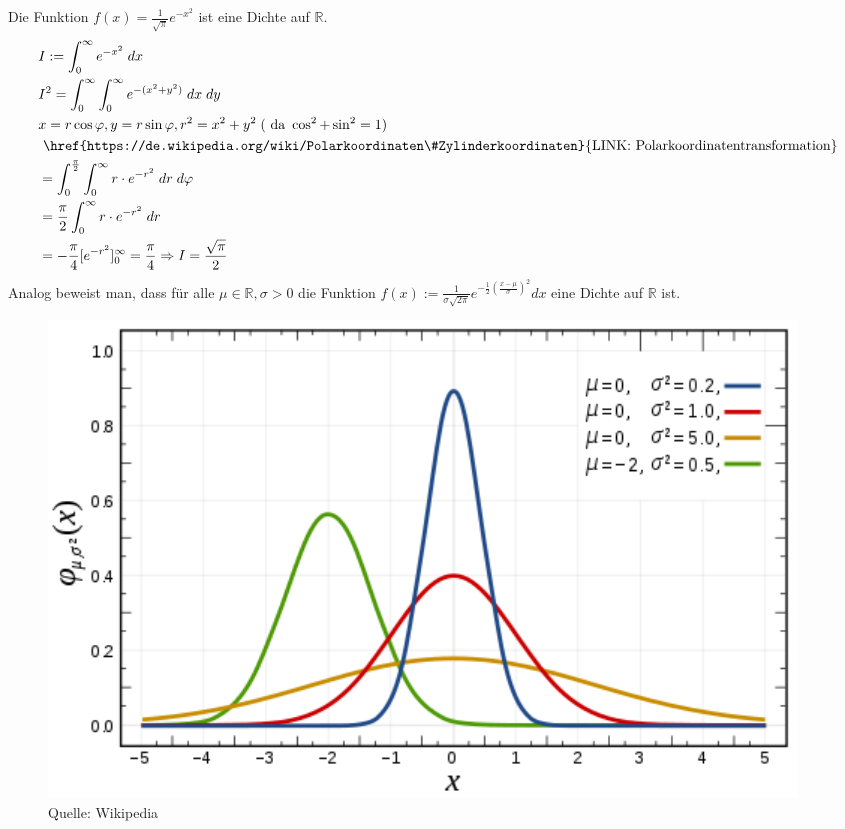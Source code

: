 \begin{Beispiel}
Die Funktion $f(x) = \frac{1}{\sqrt{\pi}} e^{- x^2}$ ist eine Dichte auf $ \mathbb{R}$.
\begin{align*}
& I := \int_{0}^{\infty} e^{-x^2} \; dx\\
& I^2 = \int_{0}^{\infty} \int_{0}^{\infty} e^{-(x^2+y^2)} \; dx \;dy \\
&x=r \cos \varphi ,y=r\sin \varphi ,r^2 = x^2 + y^2  \; (\text{ da } \cos^2 + \sin^2 = 1)\\
 &\text{ \href{https://de.wikipedia.org/wiki/Polarkoordinaten\#Zylinderkoordinaten}{LINK: Polarkoordinatentransformation}} \\
& = \int_{0}^{\frac{\pi}{2}}  \int_{0}^{\infty}r \cdot e^{-r^2} \; dr \;d\varphi \\
&= \frac{\pi}{2} \int_{0}^{\infty}r \cdot e^{-r^2} \; dr \\
&= -\frac{\pi}{4} [e^{-r^2} ]_0^{\infty} = \frac{\pi}{4} \Rightarrow I = \frac{\sqrt{\pi}}{2}
\end{align*}
Analog beweist man, dass für alle  $\mu \in \mathbb{R}, \sigma > 0 $ die Funktion $ f(x):=  \frac 1{\sigma \sqrt{2\pi}}e^{- \frac {1}{2} (\frac{x- \mu}{ \sigma})^2}dx$  eine  Dichte auf $ \mathbb{R}$ ist.
\end{Beispiel}

\begin{figure}[htp]
      \centering
    \includegraphics[width=0.96\textwidth]{images/normal}
      \caption{Quelle: Wikipedia}
\end{figure}


